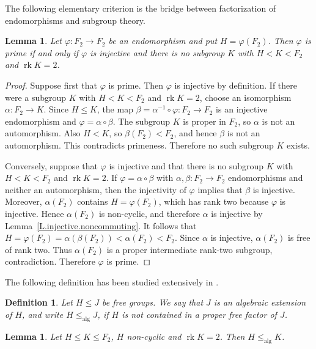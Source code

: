\documentclass{amsproc}
\newtheorem{lemma}[theorem]{Lemma}
\newtheorem{definition}[theorem]{Definition}
\newcommand{\rk}{\operatorname{rk}}
\newcommand{\alg}{\operatorname{alg}}
\begin{document}
The following elementary criterion is the bridge between factorization of
endomorphisms and subgroup theory.

\begin{lemma}\label{L.primecriterion}
Let $\varphi\colon F_2\to F_2$ be an endomorphism and put $H=\varphi(F_2)$.
Then $\varphi$ is prime if and only if $\varphi$ is injective and there is no
subgroup $K$ with $H<K<F_2$ and $\rk K=2$.
\end{lemma}

\begin{proof}
Suppose first that $\varphi$ is prime.  Then $\varphi$ is injective by
definition.  If there were a subgroup $K$ with $H<K<F_2$ and $\rk K=2$,
choose an isomorphism $\alpha\colon F_2\to K$.  Since $H\leq K$, the map
$\beta=\alpha^{-1}\circ\varphi\colon F_2\to F_2$ is an injective
endomorphism and $\varphi=\alpha\circ\beta$.  The subgroup $K$ is proper in
$F_2$, so $\alpha$ is not an automorphism.  Also $H<K$, so
$\beta(F_2)<F_2$, and hence $\beta$ is not an automorphism.  This contradicts
primeness.  Therefore no such subgroup $K$ exists.

Conversely, suppose that $\varphi$ is injective and that there is no subgroup
$K$ with $H<K<F_2$ and $\rk K=2$.  If $\varphi=\alpha\circ\beta$ with
$\alpha,\beta\colon F_2\to F_2$ endomorphisms and neither an automorphism, then
the injectivity of $\varphi$ implies that $\beta$ is injective.  Moreover,
$\alpha(F_2)$ contains $H=\varphi(F_2)$, which has rank two because $\varphi$ is
injective.  Hence $\alpha(F_2)$ is non-cyclic, and therefore $\alpha$ is
injective by Lemma~\ref{L.injective.noncommuting}.  It follows that
$H=\varphi(F_2)=\alpha(\beta(F_2))<\alpha(F_2)<F_2$.  Since $\alpha$ is
injective, $\alpha(F_2)$ is free of rank two.  Thus $\alpha(F_2)$ is a proper
intermediate rank-two subgroup, contradiction.  Therefore $\varphi$ is prime.
\end{proof}

The following definition has been studied extensively in \cite{MVW}.

\begin{definition} \label{def:alg}
Let $H\leq J$ be free groups.  We say that $J$ is an
\emph{algebraic extension} of $H$, and write $H\leq_{\alg}J$, if $H$ is not
contained in a proper free factor of $J$.
\end{definition}

\begin{lemma}
Let $H\leq K\leq F_2$, $H$ non-cyclic and $\rk K=2$.  Then
$H\leq_{\alg}K$.
\end{lemma}
\end{document}
